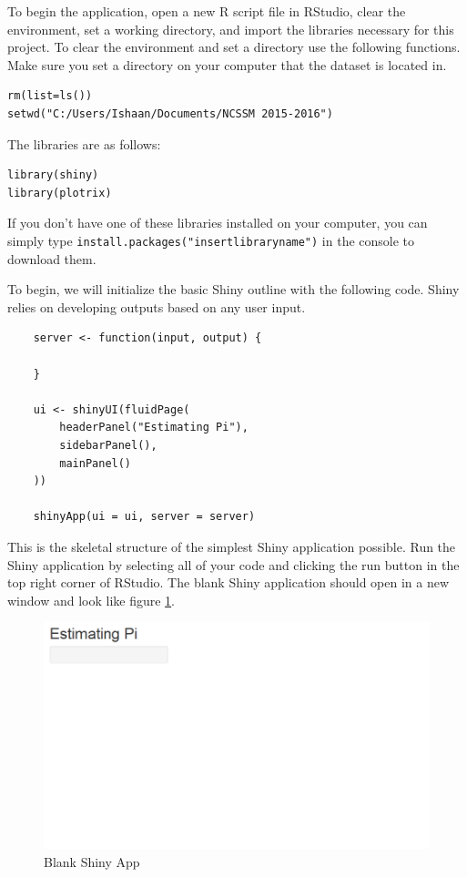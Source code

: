 \noindent 
To begin the application, open a new R script file in RStudio, clear the environment, set a working directory, and import the libraries necessary for this project.
To clear the environment and set a directory use the following functions.
Make sure you set a directory on your computer that the dataset is located in. 

\begin{lstlisting}
rm(list=ls())
setwd("C:/Users/Ishaan/Documents/NCSSM 2015-2016")
\end{lstlisting}

\noindent The libraries are as follows:

\begin{lstlisting}
library(shiny)
library(plotrix)
\end{lstlisting}


\noindent 
If you don't have one of these libraries installed on your computer, you can simply type \texttt{install.packages("insertlibraryname")} in the console to download them.

\noindent 
To begin, we will initialize the basic Shiny outline with the following code.
Shiny relies on developing outputs based on any user input.

\begin{lstlisting}
    server <- function(input, output) {
    
    }
    
    ui <- shinyUI(fluidPage(
        headerPanel("Estimating Pi"),
        sidebarPanel(),
        mainPanel()
    ))
    
    shinyApp(ui = ui, server = server)
\end{lstlisting}

\noindent 
This is the skeletal structure of the simplest Shiny application possible.
Run the Shiny application by selecting all of your code and clicking the run button in the top right corner of RStudio.
The blank Shiny application should open in a new window and look like figure \ref{fig:blankshiny}.

\begin{figure}[htbp!]
   \centering
   \includegraphics[width = .5\textwidth]{pictures/pi/blank2.PNG} 
   \caption{Blank Shiny App}
   \label{fig:blankshiny}
\end{figure}

